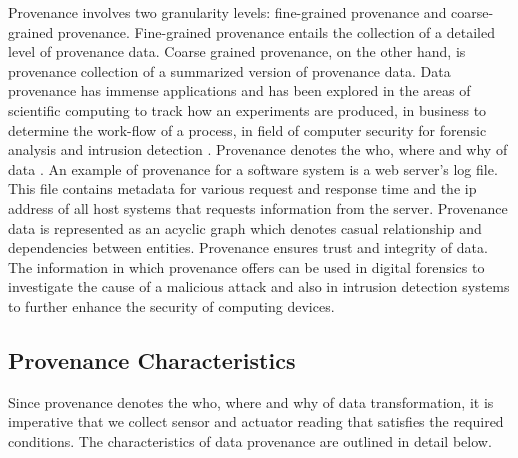 Provenance involves two granularity levels: fine-grained provenance and coarse-grained provenance. Fine-grained provenance \cite{glavic_case_2011} entails the collection of a detailed level of provenance data. Coarse grained provenance, on the other hand, is provenance collection of a summarized version of provenance data. Data provenance has immense applications and has been explored in the areas of scientific computing \cite{groth, altintas} to track how an experiments are produced, in business to determine the work-flow of  a process, in field of computer security for forensic analysis and intrusion detection \cite{bates_towards_2013, muniswamy_reddy_provenance_2010, muniswamy_reddy} . Provenance denotes the who, where and why of data \cite{cheney_provenance_2009}. An example of provenance for a software system is a web server's log file. This file contains metadata for various request and response time and the ip address of all host systems that requests information from the server. Provenance data is represented as an acyclic graph which denotes casual relationship and dependencies between entities. Provenance ensures trust and integrity of data. The information in which provenance offers can be used in digital forensics to investigate the cause of a malicious attack and also in intrusion detection systems to further enhance the security of computing devices. 





\subsection{Provenance Characteristics}

Since provenance denotes the who, where and why of data transformation, it is imperative that we collect sensor and actuator reading that satisfies the required conditions. The characteristics of data provenance are outlined in detail below.


